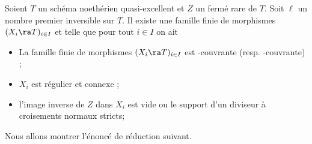 \documentclass[10pt]{../fichiers-configuration-latex/smfart}
\begin{document}
\begin{theoreme}[Uniformisation]\label{3-unif} Soient $T$ un schéma
noethérien quasi-excellent et $Z$ un fermé rare de $T$. Soit $\ell$
un nombre premier inversible sur $T$.  Il existe une famille finie de
morphismes $(X_i\ra T)_{i\in I}$  et telle que pour tout $i\in I$ on
ait \begin{itemize} \item[(i)]La famille finie de morphismes $(X_i\ra
T)_{i\in I}$   est {\pspf}-couvrante (resp. \altl-couvrante) ;
  \item[(ii)] $X_i$ est régulier et connexe ; \item[(iii)]l'image
  inverse de $Z$ dans $X_i$ est vide ou le support d'un diviseur
  à croisements normaux stricts;
\end{itemize} \end{theoreme}



Nous allons montrer l'énoncé de réduction suivant.
\end{document}
